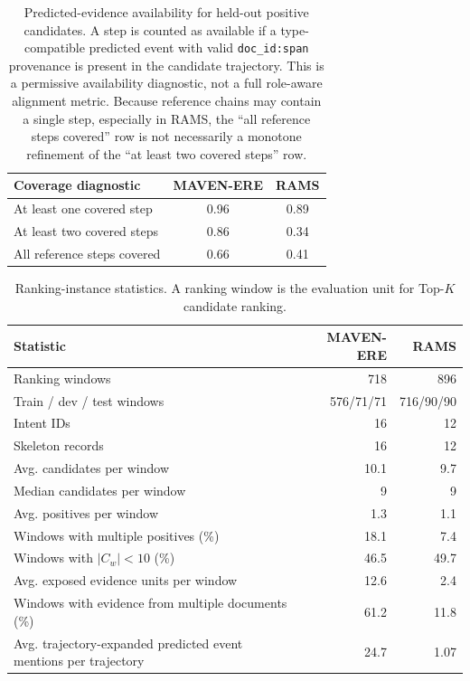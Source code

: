 \documentclass{article}
\begin{document}
\begin{table}[t]
\centering
\caption{Predicted-evidence availability for held-out positive candidates.
A step is counted as available if a type-compatible predicted event with valid \texttt{doc\_id:span} provenance is present in the candidate trajectory.
This is a permissive availability diagnostic, not a full role-aware alignment metric.
Because reference chains may contain a single step, especially in RAMS, the ``all reference steps covered'' row is not necessarily a monotone refinement of the ``at least two covered steps'' row.}
\label{tab:positive_predicted_coverage}
\small
\begin{adjustbox}{max width=\linewidth}
\begin{tabular}{lcc}
\hline
Coverage diagnostic & MAVEN-ERE & RAMS \\
\hline
At least one covered step & 0.96 & 0.89 \\
At least two covered steps & 0.86 & 0.34 \\
All reference steps covered & 0.66 & 0.41 \\
\hline
\end{tabular}
\end{adjustbox}
\end{table}

\begin{table}[t]
\centering
\caption{Ranking-instance statistics.
A ranking window is the evaluation unit for Top-$K$ candidate ranking.}
\label{tab:ranking_window_stats}
\small
\setlength{\tabcolsep}{4pt}
\begin{tabularx}{\linewidth}{Yrr}
\hline
Statistic & MAVEN-ERE & RAMS \\
\hline
Ranking windows & 718 & 896 \\
Train / dev / test windows & 576/71/71 & 716/90/90 \\
Intent IDs & 16 & 12 \\
Skeleton records & 16 & 12 \\
Avg. candidates per window & 10.1 & 9.7 \\
Median candidates per window & 9 & 9 \\
Avg. positives per window & 1.3 & 1.1 \\
Windows with multiple positives (\%) & 18.1 & 7.4 \\
Windows with $|C_w|<10$ (\%) & 46.5 & 49.7 \\
Avg. exposed evidence units per window & 12.6 & 2.4 \\
Windows with evidence from multiple documents (\%) & 61.2 & 11.8 \\
Avg. trajectory-expanded predicted event mentions per trajectory & 24.7 & 1.07 \\
\hline
\end{tabularx}
\end{table}
\end{document}
